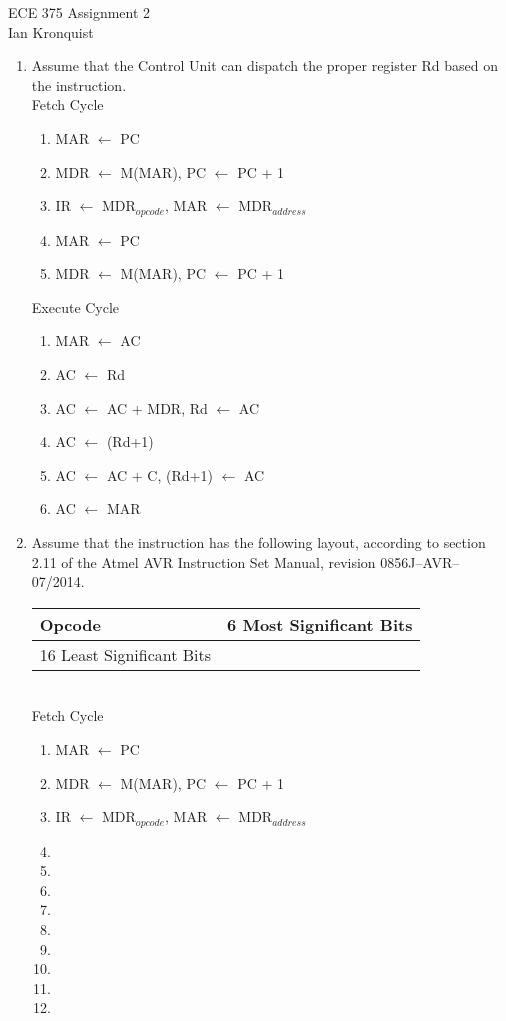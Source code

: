 \documentclass[12pt,letterpaper]{article}
\begin{document}
\begin{flushright}
{\large
ECE 375 Assignment 2\\
Ian Kronquist
}
\end{flushright}

\bigskip

\begin{enumerate}
    \item Assume that the Control Unit can dispatch the proper register Rd
    based on the instruction.\\
    Fetch Cycle
    \begin{enumerate}[i]
        \item MAR $\leftarrow$ PC
        \item MDR $\leftarrow$ M(MAR), PC $\leftarrow$ PC + 1
        \item IR $\leftarrow$ MDR$_{opcode}$, MAR $\leftarrow$ MDR$_{address}$
        \item MAR $\leftarrow$ PC
        \item MDR $\leftarrow$ M(MAR), PC $\leftarrow$ PC + 1
    \end{enumerate}

    Execute Cycle
    \begin{enumerate}[i]
        \item MAR $\leftarrow$ AC
        \item AC $\leftarrow$ Rd
        \item AC $\leftarrow$ AC + MDR, Rd $\leftarrow$ AC
        \item AC  $\leftarrow$ (Rd+1)
        \item AC $\leftarrow$ AC + C, (Rd+1) $\leftarrow$ AC
        \item AC $\leftarrow$ MAR
    \end{enumerate}
    \item Assume that the instruction has the following layout, according to
    section 2.11 of the Atmel AVR Instruction Set Manual, revision
    0856J–AVR–07/2014.\\
    \begin{tabular}{l l}
        Opcode & 6 Most Significant Bits \\
        \hline
        16 Least Significant Bits
    \end{tabular}\\
    Fetch Cycle
    \begin{enumerate}[i]
        \item MAR $\leftarrow$ PC
        \item MDR $\leftarrow$ M(MAR), PC $\leftarrow$ PC + 1
        \item IR $\leftarrow$ MDR$_{opcode}$, MAR $\leftarrow$ MDR$_{address}$
        \item 
        \item 
        \item 
        \item 
        \item 
        \item 
        \item 
        \item 
        \item 
    \end{enumerate}


\end{enumerate}
\end{document}

